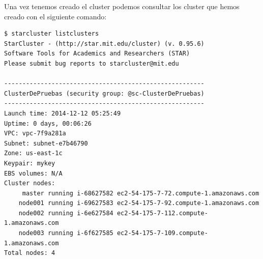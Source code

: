 \documentclass{article}
\begin{document}
	Una vez tenemos creado el cluster podemos consultar los cluster que hemos creado con el siguiente comando:
\begin{lstlisting}[style=miniBash]
$ starcluster listclusters
StarCluster - (http://star.mit.edu/cluster) (v. 0.95.6)
Software Tools for Academics and Researchers (STAR)
Please submit bug reports to starcluster@mit.edu

-------------------------------------------------------
ClusterDePruebas (security group: @sc-ClusterDePruebas)
-------------------------------------------------------
Launch time: 2014-12-12 05:25:49
Uptime: 0 days, 00:06:26
VPC: vpc-7f9a281a
Subnet: subnet-e7b46790
Zone: us-east-1c
Keypair: mykey
EBS volumes: N/A
Cluster nodes:
     master running i-68627582 ec2-54-175-7-72.compute-1.amazonaws.com
    node001 running i-69627583 ec2-54-175-7-92.compute-1.amazonaws.com
    node002 running i-6e627584 ec2-54-175-7-112.compute-1.amazonaws.com
    node003 running i-6f627585 ec2-54-175-7-109.compute-1.amazonaws.com
Total nodes: 4
\end{lstlisting}
\end{document}
